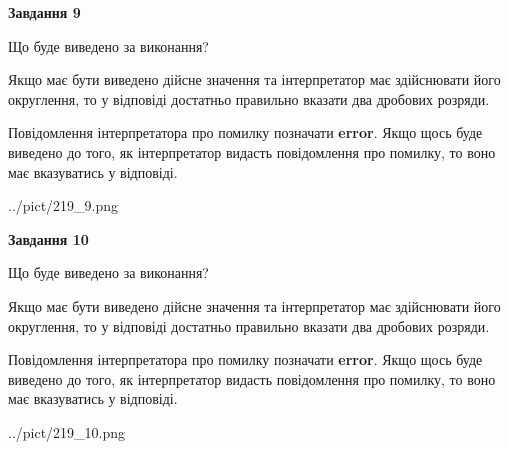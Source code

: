 \documentclass[12pt, ukrainian]{article}
\begin{document}
{\begin {Large}
{\begin {center}\textbf{Завдання 9}\end {center}}\par
Що буде виведено за виконання? \par

Якщо має бути виведено дійсне значення та інтерпретатор має здійснювати його округлення, 
то у відповіді достатньо правильно вказати два дробових розряди.

Повідомлення інтерпретатора про помилку позначати \textbf{error}.
Якщо щось буде виведено до того, як інтерпретатор видасть повідомлення про помилку, 
то воно має вказуватись у відповіді. \par

\begin{center}
	{../pict/219_9.png}
\end{center}
\newpage

{\begin {center}\textbf{Завдання 10}\end {center}}\par
Що буде виведено за виконання? \par

Якщо має бути виведено дійсне значення та інтерпретатор має здійснювати його округлення, 
то у відповіді достатньо правильно вказати два дробових розряди.

Повідомлення інтерпретатора про помилку позначати \textbf{error}.
Якщо щось буде виведено до того, як інтерпретатор видасть повідомлення про помилку, 
то воно має вказуватись у відповіді. \par

\begin{center}
	{../pict/219_10.png}
\end{center}
\newpage

\end {Large}}
\end{document}
